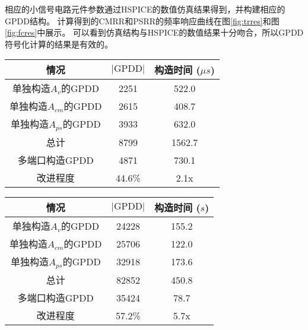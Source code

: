 相应的小信号电路元件参数通过HSPICE的数值仿真结果得到，并构建相应的GPDD结构。
计算得到的CMRR和PSRR的频率响应曲线在图\ref{fig:trres}和图\ref{fig:fcres}中展示。
可以看到仿真结构与HSPICE的数值结果十分吻合，所以GPDD符号化计算的结果是有效的。

\begin{table}[!htp]
	\centering
	\begin{tabular}{*{3}{c}}
		\hline
		       情况         & $|\mbox{GPDD}|$ & 构造时间 ($\mu s$) \\ \hline
		 单独构造$A_v$的GPDD   &      2251       &     522.0      \\
		单独构造$A_{cm}$的GPDD &      2615       &     408.7      \\
		单独构造$A_{ps}$的GPDD &      3933       &     632.0      \\
		       总计         &      8799       &     1562.7     \\ \hline
		    多端口构造GPDD     &      4871       &     730.1      \\ \hline
		      改进程度        &     44.6\%      &      2.1x      \\ \hline
	\end{tabular}
\end{table}

\begin{table}[!htp]
	\centering
	\begin{tabular}{*{3}{c}}
		\hline
		       情况         & $|\mbox{GPDD}|$ & 构造时间 ($s$) \\ \hline
		 单独构造$A_v$的GPDD   &      24228      &   155.2    \\
		单独构造$A_{cm}$的GPDD &      25706      &   122.0    \\
		单独构造$A_{ps}$的GPDD &      32918      &   173.6    \\
		       总计         &      82852      &   450.8    \\ \hline
		    多端口构造GPDD     &      35424      &    78.7    \\ \hline
		      改进程度        &     57.2\%      &    5.7x    \\ \hline
	\end{tabular}
\end{table}

